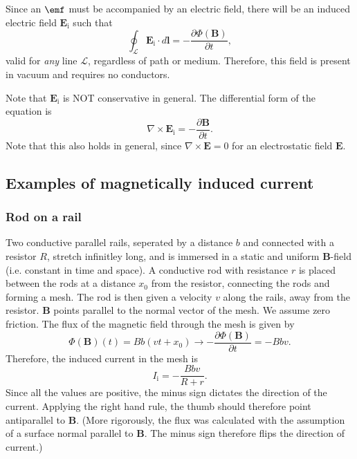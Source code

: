 \documentclass[a4paper, 12pt]{article}
\renewcommand{\vec}[1]{\mathbf{#1}}
\newcommand{\E}{\ensuremath{\vec{E}}}
\newcommand{\B}{\ensuremath{\vec{B}}}
\begin{document}
        Since an $\emf$ must be accompanied by an electric field, 
        there will be an induced electric field $\E_\text{i}$ such that
        \begin{equation}
            \oint_\mathcal{L}\E_\text{i}\cdot d\vec{l} = -\frac{\partial \Phi(\B)}{\partial t},
        \end{equation}
        valid for \textit{any} line $\mathcal{L}$, regardless of path or medium. 
        Therefore, this field is present in vacuum and requires no conductors.

        Note that $\E_\text{i}$ is NOT conservative in general. The differential form of the equation is
        \begin{equation}
            \nabla \times \E_\text{i} = -\frac{\partial \B}{\partial t}.
        \end{equation}
        Note that this also holds in general, since $\nabla\times\E = 0$ for an electrostatic field \E.
    \subsection{Examples of magnetically induced current}
        \subsubsection{Rod on a rail}
            Two conductive parallel rails, seperated by a distance $b$ and connected with a resistor $R$, stretch infinitley long, 
            and is immersed in a static and uniform \B-field (i.e. constant in time and space). 
            A conductive rod with resistance $r$ is placed between the rods at a distance $x_0$ from the resistor, 
            connecting the rods and forming a mesh. The rod is then given a velocity $v$ along the rails, away from the resistor.
            \B{} points parallel to the normal vector of the mesh. We assume zero friction. 
            The flux of the magnetic field through the mesh is given by
            \begin{equation}
                \Phi(\B)(t) = Bb(vt+x_0) \rightarrow -\frac{\partial \Phi(\B)}{\partial t} = -Bbv.
            \end{equation}
            Therefore, the induced current in the mesh is
            \begin{equation}
                I_\text{i} = -\frac{Bbv}{R+r}.
            \end{equation}
            Since all the values are positive, the minus sign dictates the direction of the current. Applying the right hand rule,
            the thumb should therefore point antiparallel to \B{}. 
            (More rigorously, the flux was calculated with the assumption of a surface normal parallel to \B. 
            The minus sign therefore flips the direction of current.)
\end{document}
